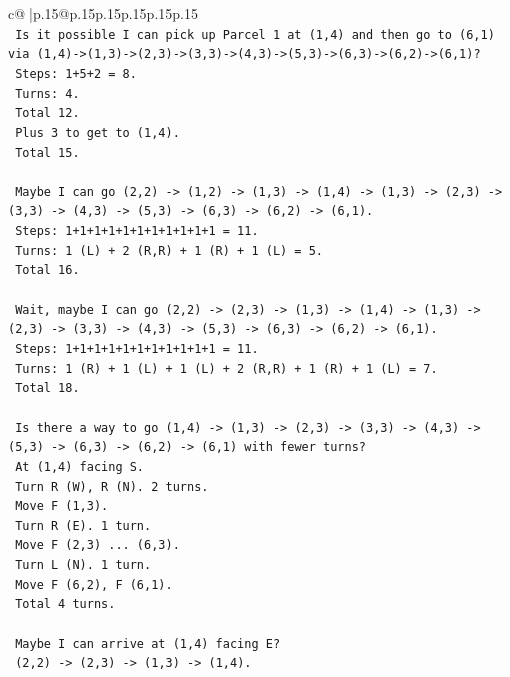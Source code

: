 \documentclass{article}
\begin{document}
{\begin{supertabular}{c@{$\;$}|p{.15\linewidth}@{}p{.15\linewidth}p{.15\linewidth}p{.15\linewidth}p{.15\linewidth}p{.15\linewidth}}
{{{\\ 
\texttt{   Is it possible I can pick up Parcel 1 at (1,4) and then go to (6,1) via (1,4){-}>(1,3){-}>(2,3){-}>(3,3){-}>(4,3){-}>(5,3){-}>(6,3){-}>(6,2){-}>(6,1)?} \\
\texttt{   Steps: 1+5+2 = 8.} \\
\texttt{   Turns: 4.} \\
\texttt{   Total 12.} \\
\texttt{   Plus 3 to get to (1,4).} \\
\texttt{   Total 15.} \\
\\ 
\texttt{   Maybe I can go (2,2) {-}> (1,2) {-}> (1,3) {-}> (1,4) {-}> (1,3) {-}> (2,3) {-}> (3,3) {-}> (4,3) {-}> (5,3) {-}> (6,3) {-}> (6,2) {-}> (6,1).} \\
\texttt{   Steps: 1+1+1+1+1+1+1+1+1+1+1 = 11.} \\
\texttt{   Turns: 1 (L) + 2 (R,R) + 1 (R) + 1 (L) = 5.} \\
\texttt{   Total 16.} \\
\\ 
\texttt{   Wait, maybe I can go (2,2) {-}> (2,3) {-}> (1,3) {-}> (1,4) {-}> (1,3) {-}> (2,3) {-}> (3,3) {-}> (4,3) {-}> (5,3) {-}> (6,3) {-}> (6,2) {-}> (6,1).} \\
\texttt{   Steps: 1+1+1+1+1+1+1+1+1+1+1 = 11.} \\
\texttt{   Turns: 1 (R) + 1 (L) + 1 (L) + 2 (R,R) + 1 (R) + 1 (L) = 7.} \\
\texttt{   Total 18.} \\
\\ 
\texttt{   Is there a way to go (1,4) {-}> (1,3) {-}> (2,3) {-}> (3,3) {-}> (4,3) {-}> (5,3) {-}> (6,3) {-}> (6,2) {-}> (6,1) with fewer turns?} \\
\texttt{   At (1,4) facing S.} \\
\texttt{   Turn R (W), R (N). 2 turns.} \\
\texttt{   Move F (1,3).} \\
\texttt{   Turn R (E). 1 turn.} \\
\texttt{   Move F (2,3) ... (6,3).} \\
\texttt{   Turn L (N). 1 turn.} \\
\texttt{   Move F (6,2), F (6,1).} \\
\texttt{   Total 4 turns.} \\
\\ 
\texttt{   Maybe I can arrive at (1,4) facing E?} \\
\texttt{   (2,2) {-}> (2,3) {-}> (1,3) {-}> (1,4).} \\
}}}
\end{supertabular}}
\end{document}

